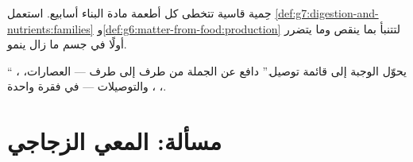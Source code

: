 \begin{exercise}[$\star\star$]\label{exo:g7:digestion-and-nutrients:11}
حِمية قاسية تتخطى كل أطعمة مادة البناء أسابيع. استعمل
\cref{def:g7:digestion-and-nutrients:families}
و\cref{def:g6:matter-from-food:production} لتتنبأ بما ينقص وما
يتضرر أولًا في جسم ما زال ينمو.
\end{exercise}

\begin{exercise}[$\star\star\star$]\label{exo:g7:digestion-and-nutrients:12}
`` يحوّل الوجبة إلى قائمة توصيل.'' دافع عن الجملة من طرف إلى
طرف --- العصارات، ، ، ، والتوصيلات --- في
فقرة واحدة.
\end{exercise}

\section{مسألة: المعي الزجاجي}

